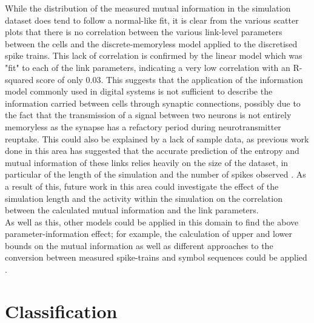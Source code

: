 While the distribution of the measured mutual information in the simulation dataset does tend to follow a normal-like fit, it is clear from the various scatter plots that there is no correlation between the various link-level parameters between the cells and the discrete-memoryless model applied to the discretised spike trains. This lack of correlation is confirmed by the linear model which was "fit" to each of the link parameters, indicating a very low correlation with an R-squared score of only 0.03. This suggests that the application of the information model commonly used in digital systems is not sufficient to describe the information carried between cells through synaptic connections, possibly due to the fact that the transmission of a signal between two neurons is not entirely memoryless as the synapse has a refactory period during neurotransmitter reuptake. This could also be explained by a lack of sample data, as previous work done in this area has suggested that the accurate prediction of the entropy and mutual information of these links relies heavily on the size of the dataset, in particular of the length of the simulation and the number of spikes observed \cite{spikeTrainInfo}. As a result of this, future work in this area could investigate the effect of the simulation length and the activity within the simulation on the correlation between the calculated mutual information and the link parameters.\\
As well as this, other models could be applied in this domain to find the above parameter-information effect; for example, the calculation of upper and lower bounds on the mutual information as well as different approaches to the conversion between measured spike-trains and symbol sequences could be applied \cite{spikeTrainInfo}.

\section{Classification}




